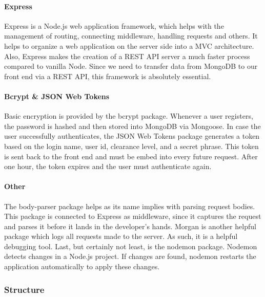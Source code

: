                 \paragraph{Express} Express is a Node.js web application framework, which helps with the management of routing, connecting middleware, handling requests and others. It helps to organize a web application on the server side into a MVC architecture. Also, Express makes the creation of a REST API server a much faster process compared to vanilla Node. Since we need to transfer data from MongoDB to our front end via a REST API, this framework is absolutely essential.

                \paragraph{Bcrypt \& JSON Web Tokens} Basic encryption is provided by the bcrypt package. Whenever a user registers, the password is hashed and then stored into MongoDB via Mongoose. In case the user successfully authenticates, the JSON Web Tokens package generates a token based on the login name, user id, clearance level, and a secret phrase. This token is sent back to the front end and must be embed into every future request. After one hour, the token expires and the user must authenticate again.

                \paragraph{Other} The body-parser package helps as its name implies with parsing request bodies. This package is connected to Express as middleware, since it captures the request and parses it before it lands in the developer's hands. Morgan is another helpful package which logs all requests made to the server. As such, it is a helpful debugging tool. Last, but certainly not least, is the nodemon package. Nodemon detects changes in a Node.js project. If changes are found, nodemon restarts the application automatically to apply these changes.


        \subsubsection{Structure}
        
